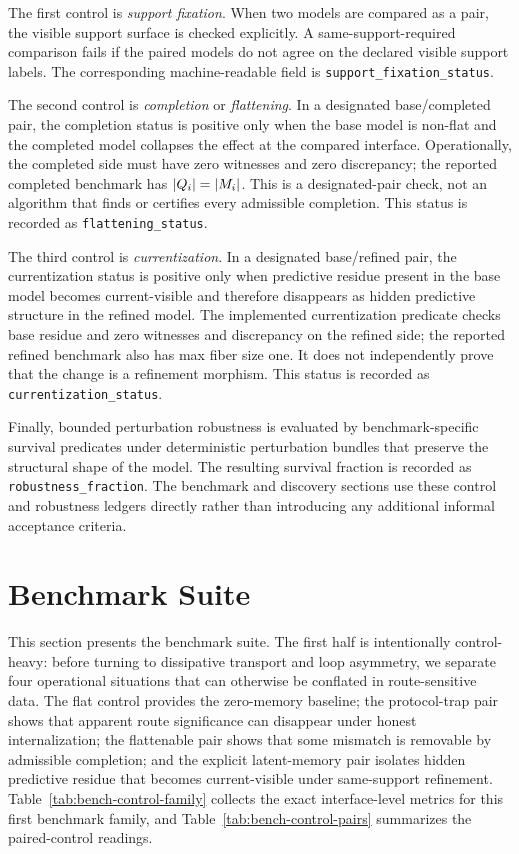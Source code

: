 \documentclass[11pt]{article}
\theoremstyle{definition}
\begin{document}
The first control is \emph{support fixation}. When two models are compared as a pair, the visible support surface is checked explicitly. A same-support-required comparison fails if the paired models do not agree on the declared visible support labels. The corresponding machine-readable field is \nolinkurl{support_fixation_status}.

The second control is \emph{completion} or \emph{flattening}. In a designated base/completed pair, the completion status is positive only when the base model is non-flat and the completed model collapses the effect at the compared interface. Operationally, the completed side must have zero witnesses and zero discrepancy; the reported completed benchmark has $|Q_i|=|M_i|$. This is a designated-pair check, not an algorithm that finds or certifies every admissible completion. This status is recorded as \nolinkurl{flattening_status}.

The third control is \emph{currentization}. In a designated base/refined pair, the currentization status is positive only when predictive residue present in the base model becomes current-visible and therefore disappears as hidden predictive structure in the refined model. The implemented currentization predicate checks base residue and zero witnesses and discrepancy on the refined side; the reported refined benchmark also has max fiber size one. It does not independently prove that the change is a refinement morphism. This status is recorded as \texttt{currentization\_status}.

Finally, bounded perturbation robustness is evaluated by benchmark-specific survival predicates under deterministic perturbation bundles that preserve the structural shape of the model. The resulting survival fraction is recorded as \texttt{robustness\_fraction}. The benchmark and discovery sections use these control and robustness ledgers directly rather than introducing any additional informal acceptance criteria.

\section{Benchmark Suite}\label{sec:benchmark-suite}
This section presents the benchmark suite. The first half is intentionally control-heavy: before turning to dissipative transport and loop asymmetry, we separate four operational situations that can otherwise be conflated in route-sensitive data. The flat control provides the zero-memory baseline; the protocol-trap pair shows that apparent route significance can disappear under honest internalization; the flattenable pair shows that some mismatch is removable by admissible completion; and the explicit latent-memory pair isolates hidden predictive residue that becomes current-visible under same-support refinement. Table~\ref{tab:bench-control-family} collects the exact interface-level metrics for this first benchmark family, and Table~\ref{tab:bench-control-pairs} summarizes the paired-control readings.
\end{document}
